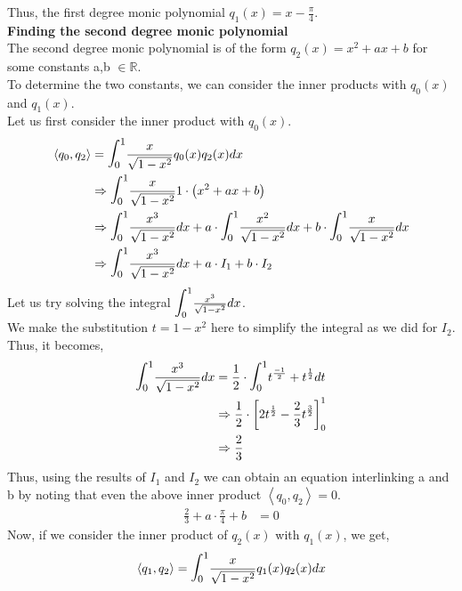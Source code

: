 \documentclass[letterpaper]{exam}
\begin{document}
\begin{questions}
\begin{parts}
\begin{solution}
Thus, the first degree monic polynomial $q_1(x) = x - \frac{\pi}{4} $.\\
\textbf{Finding the second degree monic polynomial}\\
The second degree monic polynomial is of the form $q_2(x) = x^2 + ax + b$ for some constants a,b $\in \mathbb{R}$.\\
To determine the two constants, we can consider the inner products with $q_0(x)$ and $q_1(x)$.\\
Let us first consider the inner product with $q_0(x)$.
\begin{align*}
   \left< q_0,q_2 \right> &= \mathlarger{\mathlarger{\int}}_0^1 \frac{x}{\sqrt{1-x^2}} q_0(x)q_2(x)dx \\  
   &\Rightarrow
   \mathlarger{\mathlarger{\int}}_0^1  \frac{x}{\sqrt{1-x^2}} 1\cdot \left( x^2 + ax + b\right)\\
   &\Rightarrow
     \mathlarger{\mathlarger{\int}}_0^1  \frac{x^3}{\sqrt{1-x^2}}dx + a\cdot \mathlarger{\mathlarger{\int}}_0^1  \frac{x^2}{\sqrt{1-x^2}} dx + b\cdot \mathlarger{\mathlarger{\int}}_0^1  \frac{x}{\sqrt{1-x^2}} dx\\
    &\Rightarrow
    \mathlarger{\mathlarger{\int}}_0^1  \frac{x^3}{\sqrt{1-x^2}}dx + a\cdot I_1 + b \cdot I_2
\end{align*}
Let us try solving the integral $\mathlarger{\mathlarger{\int}}_0^1  \frac{x^3}{\sqrt{1-x^2}}dx$.\\
We make the substitution $t = 1 - x^2$ here to simplify the integral as we did for $I_2$.\\
Thus, it becomes,
\begin{align*}
    \mathlarger{\mathlarger{\int}}_0^1  \frac{x^3}{\sqrt{1-x^2}}dx &= \frac{1}{2} \cdot \mathlarger{\mathlarger{\int}}_0^1  t^{\frac{-1}{2}} + t^{\frac{1}{2}} dt\\
    &\Rightarrow
    \frac{1}{2}\cdot \left[2t^{\frac{1}{2}} - \frac{2}{3}t^{\frac{3}{2}}\right]_{0}^1\\
    &\Rightarrow
    \frac{2}{3}
\end{align*}
Thus, using the results of $I_1$ and $I_2$ we can obtain an equation interlinking a and b by noting that even the above inner product $\left< q_0,q_2 \right> = 0$.
\begin{align}\label{4}
    \frac{2}{3} + a\cdot\frac{\pi}{4} + b &= 0
\end{align}
Now, if we consider the inner product of $q_2(x)$ with $q_1(x)$, we get,
\begin{align*}
   \left< q_1,q_2 \right> &= \mathlarger{\mathlarger{\int}}_0^1 \frac{x}{\sqrt{1-x^2}} q_1(x)q_2(x)dx \\  

\end{align*}
\end{solution}
\end{parts}
\end{questions}
\end{document}
